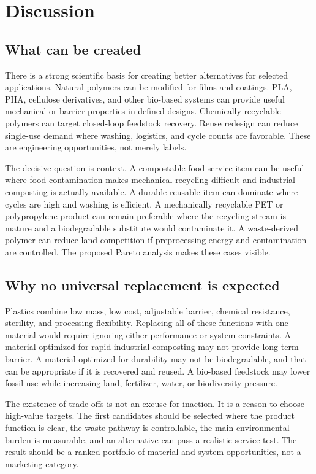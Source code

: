 \documentclass[conference]{IEEEtran}
\begin{document}
\section{Discussion}

\subsection{What can be created}

There is a strong scientific basis for creating better alternatives for selected applications. Natural polymers can be modified for films and coatings. PLA, PHA, cellulose derivatives, and other bio-based systems can provide useful mechanical or barrier properties in defined designs. Chemically recyclable polymers can target closed-loop feedstock recovery. Reuse redesign can reduce single-use demand where washing, logistics, and cycle counts are favorable. These are engineering opportunities, not merely labels.

The decisive question is context. A compostable food-service item can be useful where food contamination makes mechanical recycling difficult and industrial composting is actually available. A durable reusable item can dominate where cycles are high and washing is efficient. A mechanically recyclable PET or polypropylene product can remain preferable where the recycling stream is mature and a biodegradable substitute would contaminate it. A waste-derived polymer can reduce land competition if preprocessing energy and contamination are controlled. The proposed Pareto analysis makes these cases visible.

\subsection{Why no universal replacement is expected}

Plastics combine low mass, low cost, adjustable barrier, chemical resistance, sterility, and processing flexibility. Replacing all of these functions with one material would require ignoring either performance or system constraints. A material optimized for rapid industrial composting may not provide long-term barrier. A material optimized for durability may not be biodegradable, and that can be appropriate if it is recovered and reused. A bio-based feedstock may lower fossil use while increasing land, fertilizer, water, or biodiversity pressure.

The existence of trade-offs is not an excuse for inaction. It is a reason to choose high-value targets. The first candidates should be selected where the product function is clear, the waste pathway is controllable, the main environmental burden is measurable, and an alternative can pass a realistic service test. The result should be a ranked portfolio of material-and-system opportunities, not a marketing category.
\end{document}
